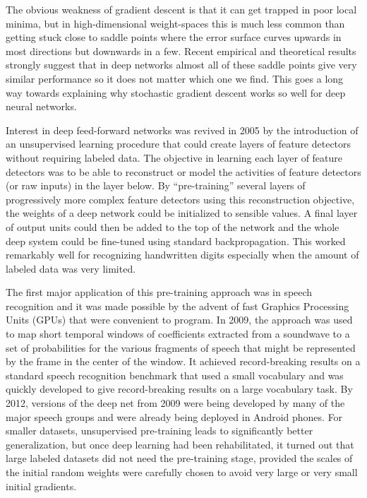 \documentclass[]{article}
\begin{document}
The obvious weakness of gradient descent is that it can get trapped in poor
local minima, but in high-dimensional weight-spaces this is much less
common than getting stuck close to saddle points where the error surface
curves upwards in most directions but downwards in a few. Recent
empirical\cite{Bengio} and theoretical results\cite{Yann} strongly suggest
that in deep networks almost all of these saddle points give very similar
performance so it does not matter which one we find.  This goes a long way
towards explaining why stochastic gradient descent works so well for deep
neural networks.

Interest in deep feed-forward networks was revived in 2005\cite{IJCAI} by
the introduction of an unsupervised learning procedure that could create
layers of feature detectors without requiring labeled data. The objective
in learning each layer of feature detectors was to be able to reconstruct
or model the activities of feature detectors (or raw inputs) in the layer
below.  By ``pre-training'' several layers of progressively more complex
feature detectors using this reconstruction objective, the weights of a
deep network could be initialized to sensible values.  A final layer of
output units could then be added to the top of the network and the whole
deep system could be fine-tuned using standard
backpropagation\cite{Science}. This worked remarkably well for recognizing
handwritten digits especially when the amount of labeled data was very
limited\cite{BengioNips06}.

The first major application of this pre-training approach was in speech
recognition and it was made possible by the advent of fast Graphics
Processing Units (GPUs) that were convenient to program.  In 2009, the
approach was used to map short temporal windows of coefficients extracted
from a soundwave to a set of probabilities for the various fragments of
speech that might be represented by the frame in the center of the window.
It achieved record-breaking results on a standard speech recognition
benchmark that used a small vocabulary\cite{TIMITpaper} and was quickly
developed to give record-breaking results on a large vocabulary
task\cite{Dahl}.  By 2012, versions of the deep net from 2009 were being
developed by many of the major speech groups\cite{SPS} and were already
being deployed in Android phones.  For smaller datasets, unsupervised
pre-training leads to significantly better generalization, but once deep
learning had been rehabilitated, it turned out that large labeled datasets
did not need the pre-training stage, provided the scales of the initial
random weights were carefully chosen to avoid very large or very small
initial gradients.
\end{document}
